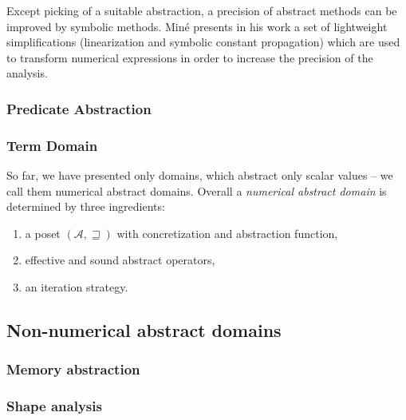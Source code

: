 Except picking of a suitable abstraction, a precision of abstract methods can
be improved by symbolic methods. Miné presents in his work \cite{Mine2006} a
set of lightweight simplifications (linearization and symbolic constant
propagation) which are used to transform numerical expressions in order to
increase the precision of the analysis.

\subsubsection{Predicate Abstraction}

\subsubsection{Term Domain}

\prule
\bigskip

So far, we have presented only domains, which abstract only scalar values -- we call
them numerical abstract domains.  Overall a \emph{numerical abstract domain} is
determined by three ingredients:
\begin{enumerate}
    \item a poset $(\mathcal{A}, \sqsupseteq)$ with concretization and abstraction function,
    \item effective and sound abstract operators,
    \item an iteration strategy.
\end{enumerate}

\subsection{Non-numerical abstract domains}

\subsubsection{Memory abstraction}




\subsubsection{Shape analysis}


